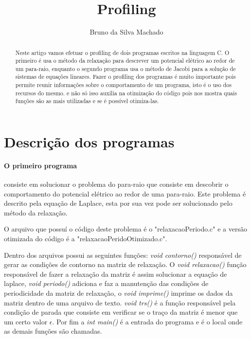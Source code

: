\documentclass[]{article}
\title{Profiling}
\author{Bruno da Silva Machado}
\begin{document}
\maketitle

\begin{abstract}

Neste artigo vamos efetuar o profiling de dois programas escritos na linguagem C. O primeiro é usa o método da relaxação para descrever um potencial elétrico ao redor de um para-raio, enquanto o segundo programa usa o método de Jacobi para a solução de sistemas de equações lineares. Fazer o profiling dos programas é muito importante pois permite reunir informações sobre o comportamento de um programa, isto é o uso dos recursos do mesmo. e não só isso auxilia na otimização do código pois nos mostra quais funções são as mais utilizadas e se é possível otimiza-las.

\end{abstract}

\section{Descrição dos programas}

\paragraph{O primeiro programa} consiste em solucionar o problema do para-raio que consiste em descobrir o comportamento do potencial elétrico ao redor de uma para-raio. Este problema é descrito pela equação de Laplace, esta por sua vez pode ser solucionado pelo método da relaxação. 

O arquivo que possuí o código deste problema é o "relaxacaoPeriodo.c" e a versão otimizada do código é a  "relaxacaoPeridoOtimizado.c". 

Dentro dos arquivos possui as seguintes funções: \textit{void contorno()} responsável de gerar as condições de contorno na matriz de relaxação. O \textit{void relaxacao()} função responsável de fazer a relaxação da matriz é assim solucionar a equação de laplace, \textit{void periodo()} adiciona e faz a manutenção das condições de periodicidade da matriz de relaxação, o \textit{void imprime()} imprime os dados da matriz dentro de uma arquivo de texto. \textit{void trs()} é a função responsável pela condição de parada que consiste em verificar se o traço da matriz é menor que um certo valor $\epsilon$. Por fim a \textit{int main()} é a entrada do programa e é o local onde as demais funções são chamadas.
\end{document}
